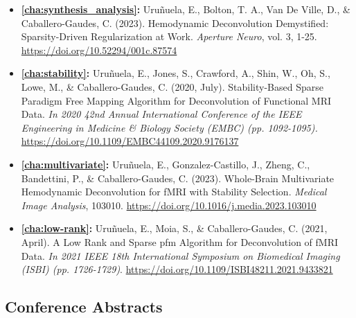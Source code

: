 \begin{itemize}
    \item {\textbf{\cref{cha:synthesis_analysis}:} Uruñuela, E., Bolton, T. A.,
    Van De Ville, D., \& Caballero-Gaudes, C. (2023). Hemodynamic Deconvolution
    Demystified: Sparsity-Driven Regularization at Work. \textit{Aperture
    Neuro}, vol. 3, 1-25. \url{https://doi.org/10.52294/001c.87574}}
    \item {\textbf{\cref{cha:stability}:} Uruñuela, E., Jones, S., Crawford, A.,
    Shin, W., Oh, S., Lowe, M., \& Caballero-Gaudes, C. (2020, July).
    Stability-Based Sparse Paradigm Free Mapping Algorithm for Deconvolution of
    Functional MRI Data. \textit{In 2020 42nd Annual International Conference of
    the IEEE Engineering in Medicine \& Biology Society (EMBC) (pp. 1092-1095).}
    \url{https://doi.org/10.1109/EMBC44109.2020.9176137}}
    \item {\textbf{\cref{cha:multivariate}:} Uruñuela, E., Gonzalez-Castillo,
    J., Zheng, C., Bandettini, P., \& Caballero-Gaudes, C. (2023). Whole-Brain
    Multivariate Hemodynamic Deconvolution for fMRI with Stability Selection.
    \textit{Medical Image Analysis}, 103010.
    \url{https://doi.org/10.1016/j.media.2023.103010}}
    \item {\textbf{\cref{cha:low-rank}:} Uruñuela, E., Moia, S., \&
    Caballero-Gaudes, C. (2021, April). A Low Rank and Sparse \acrlong*{pfm}
    Algorithm for Deconvolution of fMRI Data. \textit{In 2021 IEEE 18th
    International Symposium on Biomedical Imaging (ISBI) (pp. 1726-1729)}.
    \url{https://doi.org/10.1109/ISBI48211.2021.9433821}}
\end{itemize}

\subsection{Conference Abstracts}


